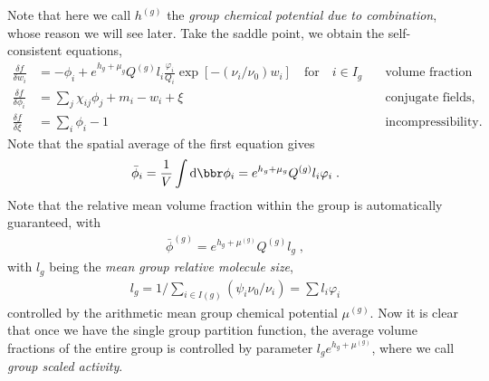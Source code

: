 \documentclass[aps,prl,reprint,onecolumn,groupedaddress,amsmath,amssymb]{revtex4-2}
\newcommand{\dd}{{\mathrm{d}}}
\newcommand{\bphi}{{\bar{\phi}}}
\begin{document}
Note that here we call $h^{(g)}$ the \emph{group chemical potential due to combination}, whose reason we will see later.
Take the saddle point, we obtain the self-consistent equations,
\begin{subequations}
    \begin{align}
        \frac{\delta f}{\delta w_i}    & = -\phi_i + e^{h_g + \mu_g} Q^{(g)} l_i \frac{ \varphi_i}{Q_i}\exp\left[-\left(\nu_i/\nu_0\right) w_i\right]  \quad \text{for} \quad i\in I_g \quad & \text{volume fraction fields,} \\
        \frac{\delta f}{\delta \phi_i} & = \sum_j \chi_{ij} \phi_j + m_i -w_i + \xi     \quad                                                                                                & \text{conjugate fields,}       \\
        \frac{\delta f}{\delta \xi}    & = \sum_i \phi_i -1     \quad                                                                                                                        & \text{incompressibility.}
    \end{align}
\end{subequations}
Note that the spatial average of the first equation gives
\begin{align}
    \bphi_i = \frac{1}{V} \int \dd \bbr \phi_i = e^{h_g + \mu_g} Q^{(g)} l_i \varphi_i \;.
\end{align}
Note that the relative mean volume fraction within the group is automatically guaranteed, with
\begin{align}
    \bphi^{(g)} =  e^{h_g + \mu^{(g)}} Q^{(g)} l_g \;,
\end{align}
with $l_g$ being the \emph{mean group relative molecule size},
\begin{align}
    l_g = 1/\sum_{i \in I(g)} \left(\psi_i \nu_0 / \nu_i\right) = \sum l_i \varphi_i
\end{align}
controlled by the arithmetic mean group chemical potential $\mu^{(g)}$.
Now it is clear that once we have the single group partition function, the average volume fractions of the entire group is controlled by parameter $l_g e^{h_g + \mu^{(g)}}$, where we call \emph{group scaled activity}.
\end{document}
